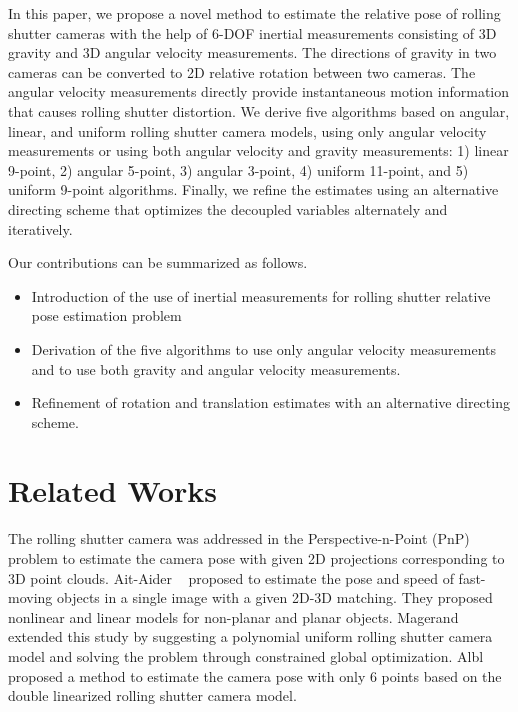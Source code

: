 \documentclass[10pt,twocolumn,letterpaper]{article}
\theoremstyle{definition}
\begin{document}
	In this paper, we propose a novel method to estimate the relative pose of rolling shutter cameras with the help of 6-DOF inertial measurements consisting of 3D gravity and 3D angular velocity measurements.
	The directions of gravity in two cameras can be converted to 2D relative rotation between two cameras.
	The angular velocity measurements directly provide instantaneous motion information that causes rolling shutter distortion.
	We derive five algorithms based on angular, linear, and uniform rolling shutter camera models, using only angular velocity measurements or using both angular velocity and gravity measurements: 1) linear 9-point, 2) angular 5-point, 3) angular 3-point, 4) uniform 11-point, and 5) uniform 9-point algorithms.
	Finally, we refine the estimates using an alternative directing scheme that optimizes the decoupled variables alternately and iteratively.
	
	Our contributions can be summarized as follows.
	\begin{itemize}	
		\vspace{-2.5mm} 
		\setlength\itemsep{-1mm}
		\item Introduction of the use of inertial measurements for rolling shutter relative pose estimation problem
		\item Derivation of the five algorithms to use only angular velocity measurements and to use both gravity and angular velocity measurements.
		\item Refinement of rotation and translation estimates with an alternative directing scheme.
	\end{itemize} 
	
	
	
	
	
	
	\section{Related Works}\label{sec:related_works}
	
	
	
	The rolling shutter camera was addressed in the Perspective-n-Point (PnP) problem to estimate the camera pose with given 2D projections corresponding to 3D point clouds.
	Ait-Aider \etal~\cite{Ait:ECCV:2006} proposed to estimate the pose and speed of fast-moving objects in a single image with a given 2D-3D matching.
	They proposed nonlinear and linear models for non-planar and planar objects.
	Magerand \etal~\cite{Magerand:ECCV:2012} extended this study by suggesting a polynomial uniform rolling shutter camera model and solving the problem through constrained global optimization.
	Albl \etal~\cite{Albl:CVPR:2015} proposed a method to estimate the camera pose with only 6 points based on the double linearized rolling shutter camera model.
	
\end{document}
